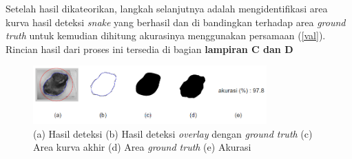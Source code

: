 Setelah hasil dikateorikan, langkah selanjutnya adalah mengidentifikasi area kurva hasil deteksi \emph{snake} yang berhasil dan di bandingkan terhadap area \emph{ground truth} untuk kemudian dihitung akurasinya menggunakan persamaan (\ref{val}). Rincian hasil dari proses ini tersedia di bagian \textbf{lampiran C dan D}
\begin{figure}[H]
	\centering
	\includegraphics[width=0.8\textwidth]{gambar/result_val}
	\caption{(a) Hasil deteksi (b) Hasil deteksi \emph{overlay} dengan \emph{ground truth} (c) Area kurva akhir (d) Area \emph{ground truth} (e) Akurasi}
	\label{Gambar:result_val}
\end{figure}


